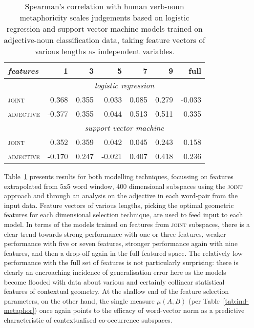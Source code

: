 \begin{table}
\centering
\begin{tabular}{lrrrrrr}
\hline
\emph{features} & 1 & 3 & 5 & 7 & 9 & full \\
\hline
& \multicolumn{6}{c}{\emph{logistic regression}} \\
\textsc{joint} & 0.368 & 0.355 & 0.033 & 0.085 & 0.279 & -0.033 \\
\textsc{adjective} & -0.377 & 0.355 & 0.044 & 0.513 & 0.511 & 0.335 \\
\hline
& \multicolumn{6}{c}{\emph{support vector machine}} \\
\textsc{joint} & 0.352 & 0.359 & 0.042 & 0.045 & 0.243 & 0.158 \\
\textsc{adjective} & -0.170 & 0.247 & -0.021 & 0.407 & 0.418 & 0.236 \\
\hline
\end{tabular}
\caption[Scoring Metaphoricity Based On Classification Data]{Spearman's correlation with human verb-noun metaphoricity scales judgements based on logistic regression and support vector machine models trained on adjective-noun classification data, taking feature vectors of various lengths as independent variables.}
\label{tab:verblearn}
\end{table}

Table~\ref{tab:verblearn} presents results for both modelling techniques, focussing on features extrapolated from 5x5 word window, 400 dimensional subspaces using the \textsc{joint} approach and through an analysis on the adjective in each word-pair from the input data.  Feature vectors of various lengths, picking the optimal geometric features for each dimensional selection technique, are used to feed input to each model.  In terms of the models trained on features from \textsc{joint} subspaces, there is a clear trend towards strong performance with one or three features, weaker performance with five or seven features, stronger performance again with nine features, and then a drop-off again in the full featured space.  The relatively low performance with the full set of features is not particularly surprising: there is clearly an encroaching incidence of generalisation error here as the models become flooded with data about various and certainly collinear statistical features of contextual geometry.  At the shallow end of the feature selection parameters, on the other hand, the single measure $\mu(A,B)$ (per Table~\ref{tab:ind-metaphor}) once again points to the efficacy of word-vector norm as a predictive characteristic of contextualised co-occurrence subspaces.

